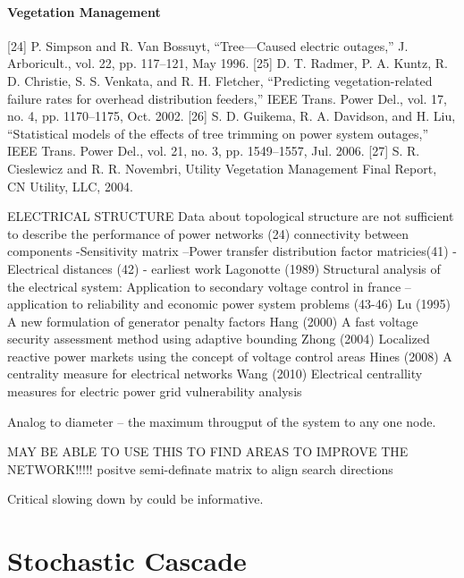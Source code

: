 \subsubsection{Vegetation Management}
[24] P. Simpson and R. Van Bossuyt, “Tree—Caused electric outages,” J.
Arboricult., vol. 22, pp. 117–121, May 1996.
[25] D. T. Radmer, P. A. Kuntz, R. D. Christie, S. S. Venkata, and R.
H. Fletcher, “Predicting vegetation-related failure rates for overhead
distribution feeders,” IEEE Trans. Power Del., vol. 17, no. 4, pp.
1170–1175, Oct. 2002.
[26] S. D. Guikema, R. A. Davidson, and H. Liu, “Statistical models of the
effects of tree trimming on power system outages,” IEEE Trans. Power
Del., vol. 21, no. 3, pp. 1549–1557, Jul. 2006.
[27] S. R. Cieslewicz and R. R. Novembri, Utility Vegetation Management
Final Report, CN Utility, LLC, 2004.

\cite{qi_2013}

ELECTRICAL STRUCTURE
Data about topological structure are not sufficient to describe the performance of power networks (24)
connectivity between components
-Sensitivity matrix
--Power transfer distribution factor matricies(41)
-Electrical distances (42) - earliest work
Lagonotte (1989) Structural analysis of the electrical system: Application to secondary voltage control in france
--application to reliability and economic power system problems (43-46)
Lu (1995) A new formulation of generator penalty factors
Hang (2000) A fast voltage security assessment method using adaptive bounding
Zhong (2004) Localized reactive power markets using the concept of voltage control areas
Hines (2008) A centrality measure for electrical networks
Wang (2010) Electrical centrallity measures for electric power grid vulnerability analysis



Analog to diameter  -- the maximum througput of the system to any one node.


MAY BE ABLE TO USE THIS TO FIND AREAS TO IMPROVE THE NETWORK!!!!! positve semi-definate matrix to align search directions

Critical slowing down by \cite{hines_2011} could be informative.




\chapter{Stochastic Cascade}

